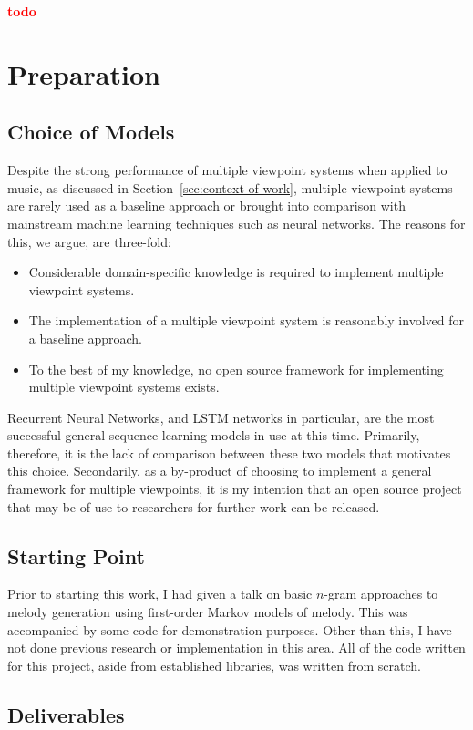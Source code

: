 \documentclass[12pt,a4paper,twoside,openright]{report}
\newcommand{\todo}{\textcolor{red}{\textbf{todo}~}}
\begin{document}
\todo

\chapter{Preparation}

\section{Choice of Models}

Despite the strong performance of multiple viewpoint systems when applied to
music, as discussed in Section~\ref{sec:context-of-work}, multiple viewpoint
systems are rarely used as a baseline approach or brought into comparison with
mainstream machine learning techniques such as neural networks. The reasons for
this, we argue, are three-fold:
\begin{itemize}
  \item Considerable domain-specific knowledge is required to implement multiple
    viewpoint systems.
  \item The implementation of a multiple viewpoint system is reasonably involved
    for a baseline approach.
  \item To the best of my knowledge, no open source framework for implementing
    multiple viewpoint systems exists.
\end{itemize}

Recurrent Neural Networks, and LSTM networks in particular, are the most
successful general sequence-learning models in use at this time. Primarily,
therefore, it is the lack of comparison between these two models that motivates
this choice. Secondarily, as a by-product of choosing to implement a general
framework for multiple viewpoints, it is my intention that an open source
project that may be of use to researchers for further work can be released.

\section{Starting Point}

Prior to starting this work, I had given a talk on basic $n$-gram approaches to
melody generation using first-order Markov models of melody. This was
accompanied by some code for demonstration purposes. Other than this, I have
not done previous research or implementation in this area. All of the code
written for this project, aside from established libraries, was written from
scratch.

\section{Deliverables}
\end{document}
